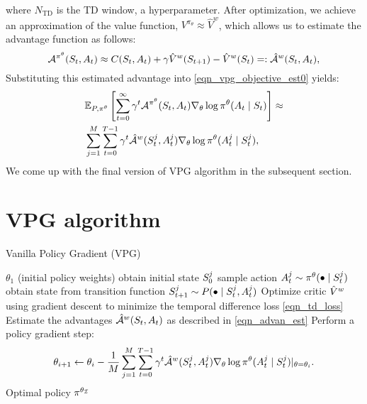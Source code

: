 \documentclass[12pt,twoside]{../../mitthesis}
\begin{document}
where $N_{\text{TD}}$ is the TD window, a hyperparameter.
After optimization, we achieve an approximation of the value function, $V^{\pi_{\theta}} \approx \hat{V}^w$, which allows us to estimate the advantage function as follows: 
\begin{equation}
    \label{eqn_advan_est}
    \Advan^{\policy^{\theta}}(\State_t, \Action_t) \approx \Cost(\State_t, \Action_t) + \gamma \hat\Value^w(\State_{t+1}) - \hat\Value^w(\State_t) =: \hat\Advan^{w}(\State_t, \Action_t) ,
\end{equation}
Substituting this estimated advantage into \eqref{eqn_vpg_objective_est0} yields:
\begin{equation}
    \label{eqn_vpg_objective_est}
    \begin{aligned}
    &\E[\transit, \policy^{\theta}]{ \sum_{t = 0}^{\infty}\gamma^t\Advan^{\policy^{\theta}} (\State_t, \Action_t)\nabla_{\theta} \log \policy^{\theta}(\Action_t \mid \State_t)} \approx \\ 
    &\sum_{j = 1}^M \sum_{t=0}^{T-1} \gamma ^ t \hat\Advan^{w}(\State_t^j, \Action_t^j) \nabla_{\theta} \log \policy^{\theta}(\Action_t^j \mid \State_t^j),
    \end{aligned}
\end{equation}
We come up with the final version of VPG algorithm in the subsequent section.
\section*{VPG algorithm}
\begin{algorithm}
    \caption{Vanilla Policy Gradient (VPG)}
    \label{alg:my-alg}
    \begin{algorithmic}[1]
     $\theta_1$ (initial policy weights)
            \STATE obtain initial state $S_0^{j}$
                \STATE sample action $A_t^j \sim \pi^{\theta}(\bullet \mid S_t^{j})$
                \STATE obtain state from transition function $S_{t+1}^j \sim P(\bullet \mid S_t^j, A_t^j)$
            \ENDFOR
        \ENDFOR
        \STATE Optimize critic $\hat{V}^{w}$ using gradient descent to minimize the temporal difference loss \eqref{eqn_td_loss}
        \STATE Estimate the advantages $\hat{\mathcal A}^{w}(S_t, A_t)$ as described in \eqref{eqn_advan_est}  
        \STATE Perform a policy gradient step:
        $$
            \theta_{i+1} \leftarrow \theta_i - \frac{1}{M} \sum_{j = 1}^M \sum_{t=0}^{T-1} \gamma ^ t \hat{\mathcal A}^{w}(S_t^j, A_t^j) \nabla_{\theta} \log \pi^{\theta}(A_t^j \mid S_t^j)\rvert_{\theta = \theta_i}.
        $$
    \ENDFOR
    \STATE \RETURN Optimal policy $\pi^{\theta_{\mathcal I}}$
    \end{algorithmic}
\end{algorithm}
\end{document}
